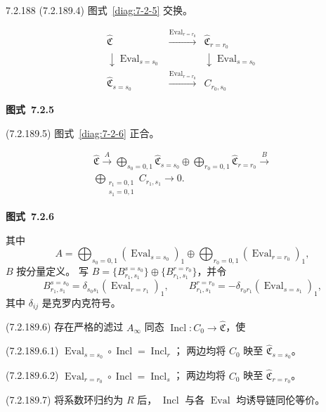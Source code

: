 \begin{definition}{7.2.188}
\noindent\textup{(7.2.189.4)}
图式~\ref{diag:7-2-5} 交换。

\par\medskip\noindent\begin{minipage}{\textwidth}
\centering
\[
\begin{array}{ccc}
\widehat{\mathfrak C}&
\xrightarrow{\operatorname{Eval}_{r=r_0}}&
\widehat{\mathfrak C}_{r=r_0}\\[1ex]
\downarrow\scriptstyle\operatorname{Eval}_{s=s_0}&&
\downarrow\scriptstyle\operatorname{Eval}_{s=s_0}\\[1ex]
\widehat{\mathfrak C}_{s=s_0}&
\xrightarrow{\operatorname{Eval}_{r=r_0}}&
C_{r_0,s_0}
\end{array}
\]
\par{\renewcommand{\thefigure}{7.2.5}
\normalfont\bfseries 图式~\thefigure\label{diag:7-2-5}}
\end{minipage}\par\medskip

\noindent\textup{(7.2.189.5)}
图式~\ref{diag:7-2-6} 正合。

\par\medskip\noindent\begin{minipage}{\textwidth}
\centering
\[
\begin{gathered}
\widehat{\mathfrak C}
\xrightarrow{A}
\bigoplus_{s_0=0,1}\widehat{\mathfrak C}_{s=s_0}
\oplus
\bigoplus_{r_0=0,1}\widehat{\mathfrak C}_{r=r_0}
\xrightarrow{B}\\
\bigoplus_{\substack{r_1=0,1\\s_1=0,1}}C_{r_1,s_1}
\longrightarrow0.
\end{gathered}
\]
\par{\renewcommand{\thefigure}{7.2.6}
\normalfont\bfseries 图式~\thefigure\label{diag:7-2-6}}
\end{minipage}\par\medskip
其中
\[
A=\bigoplus_{s_0=0,1}
(\operatorname{Eval}_{s=s_0})_1
\oplus
\bigoplus_{r_0=0,1}
(\operatorname{Eval}_{r=r_0})_1,
\]
$B$ 按分量定义。
写
$B=\{B^{s=s_0}_{r_1,s_1}\}
\oplus\{B^{r=r_0}_{r_1,s_1}\}$，并令
\[
B^{s=s_0}_{r_1,s_1}
=\delta_{s_0s_1}
(\operatorname{Eval}_{r=r_1})_1,
\qquad
B^{r=r_0}_{r_1,s_1}
=-\delta_{r_0r_1}
(\operatorname{Eval}_{s=s_1})_1,
\]
其中 $\delta_{ij}$ 是克罗内克符号。

\noindent\textup{(7.2.189.6)}
存在严格的滤过 $A_\infty$ 同态
$\operatorname{Incl}\colon C_0\to
\widehat{\mathfrak C}$，使

\noindent\textup{(7.2.189.6.1)}
$\operatorname{Eval}_{s=s_0}\circ\operatorname{Incl}
=\operatorname{Incl}_r$；
两边均将 $C_0$ 映至
$\widehat{\mathfrak C}_{s=s_0}$。

\noindent\textup{(7.2.189.6.2)}
$\operatorname{Eval}_{r=r_0}\circ\operatorname{Incl}
=\operatorname{Incl}_s$；
两边均将 $C_0$ 映至
$\widehat{\mathfrak C}_{r=r_0}$。

\noindent\textup{(7.2.189.7)}
将系数环归约为 $R$ 后，
$\operatorname{Incl}$ 与各
$\operatorname{Eval}$ 均诱导链同伦等价。
\end{definition}

